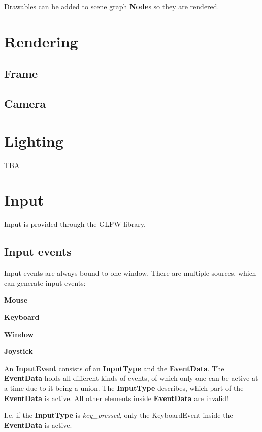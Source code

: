 \documentclass[12p, paper=a4, leqno, colorinlistoftodos]{article}
\newenvironment{packed_itemize}
{\begin{itemize}
		\setlength{\itemsep}{0pt}
		\setlength{\parskip}{0pt}
		\setlength{\parsep}{0pt}
	}{\end{itemize}}
\begin{document}
			Drawables can be added to scene graph \textbf{Node}s so they are rendered.
		
	\pagebreak
	\section{Rendering}
		
		\subsection{Frame}
		
		\subsection{Camera}
		
	
	\pagebreak
	\section{Lighting}
		TBA
		
		
		
	\pagebreak
	\section{Input}
	Input is provided through the GLFW library.
		
		\subsection{Input events}
		Input events are always bound to one window. There are multiple sources, which can generate input events:
		\begin{packed_itemize}
			\item \textbf{Mouse}
			\item \textbf{Keyboard}
			\item \textbf{Window}
			\item \textbf{Joystick}
		\end{packed_itemize}
		An \textbf{InputEvent} consists of an \textbf{InputType} and the \textbf{EventData}. The \textbf{EventData} holds all different kinds of events, of which only one can be active at a time due to it being a union. The \textbf{InputType} describes, which part of the \textbf{EventData} is active. All other elements inside \textbf{EventData} are invalid!
		
		I.e. if the \textbf{InputType} is \textit{key\_pressed}, only the KeyboardEvent inside the \textbf{EventData} is active.
\end{document}

